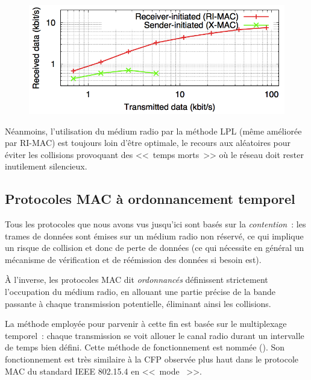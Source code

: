 \begin{figure}[!hbt]
\centering
\includegraphics[width=12.5cm]{images/ch3-ri-vs-si.png}
\label{FigRIvsSI}
\end{figure}

Néanmoins, l'utilisation du médium radio par la méthode LPL (même améliorée
par RI-MAC) est toujours loin d'être optimale, le recours aux 
aléatoires pour éviter les collisions provoquant des <<~temps morts~>> où
le réseau doit rester inutilement silencieux.


\subsection{Protocoles MAC à ordonnancement temporel}
\label{SubsecProtoMACTDMA}

Tous les protocoles que nous avons vus jusqu'ici sont basés sur la
\emph{contention}~: les trames de données sont émises sur un médium radio
non réservé, ce qui implique un risque de collision et donc de perte de
données (ce qui nécessite en général un mécanisme de vérification et de
réémission des données si besoin est).

À l'inverse, les protocoles MAC dit \emph{ordonnancés} définissent
strictement l'occupation du médium radio, en allouant une partie
précise de la bande passante à chaque transmission potentielle, éliminant
ainsi les collisions.

La méthode employée pour parvenir à cette fin est basée sur le multiplexage
temporel~: chaque transmission se voit allouer le canal radio durant un
intervalle de temps bien défini. Cette méthode de fonctionnement est nommée
 (). Son fonctionnement est
très similaire à la CFP observée plus haut dans le protocole MAC du standard
IEEE 802.15.4 en <<~mode ~>>.

